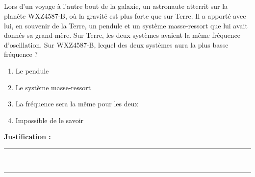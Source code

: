 \subsection{}
Lors d’un voyage à l’autre bout de la galaxie, un astronaute atterrit sur la planète WXZ4587-B, où la gravité est plus forte que sur Terre. Il a apporté avec lui, en souvenir de la Terre, un pendule et un système masse-ressort que lui avait donnés sa grand-mère. Sur Terre, les deux systèmes avaient la même fréquence d’oscillation. Sur WXZ4587-B, lequel des deux systèmes aura la plus basse fréquence ?

\begin{enumerate}[label=\Alph*)]
    \item Le pendule
    \item Le système masse-ressort
    \item La fréquence sera la même pour les deux
    \item Impossible de le savoir
\end{enumerate}
\noindent\textbf{Justification :} \hrulefill \\[2.5ex]
\rule{\linewidth}{0.4pt} \\[2.5ex]
\rule{\linewidth}{0.4pt}
\vfill